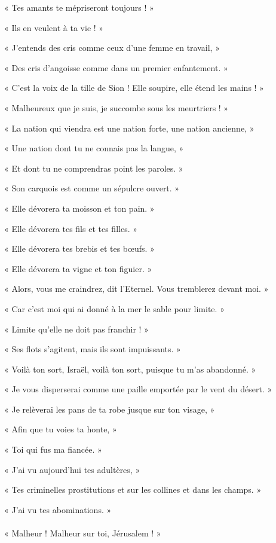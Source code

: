\documentclass[a4paper, 11pt, oneside, polutonikogreek, french]{article}
\begin{document}
« Tes amants te mépriseront toujours ! »

« Ils en veulent à ta vie ! »

« J'entends des cris comme ceux d'une femme en travail, »

« Des cris d'angoisse comme dans un premier enfantement. »

« C'est la voix de la tille de Sion ! Elle soupire, elle étend les mains ! »

« Malheureux que je suis, je succombe sous les meurtriers ! »

« La nation qui viendra est une nation forte, une nation ancienne, »

« Une nation dont tu ne connais pas la langue, »

« Et dont tu ne comprendras point les paroles. »

« Son carquois est comme un sépulcre ouvert. »

« Elle dévorera ta moisson et ton pain. »

« Elle dévorera tes fils et tes filles. »

« Elle dévorera tes brebis et tes bœufs. »

« Elle dévorera ta vigne et ton figuier. »

« Alors, vous me craindrez, dit l'Eternel. Vous tremblerez devant moi. »

« Car c'est moi qui ai donné à la mer le sable pour limite. »

« Limite qu'elle ne doit pas franchir ! »

« Ses flots s'agitent, mais ils sont impuissants. »

« Voilà ton sort, Israël, voilà ton sort, puisque tu m'as abandonné. »

« Je vous disperserai comme une paille emportée par le vent du désert. »

« Je relèverai les pans de ta robe jusque sur ton visage, »

« Afin que tu voies ta honte, »

« Toi qui fus ma fiancée. »

« J'ai vu aujourd'hui tes adultères, »

« Tes criminelles prostitutions et sur les collines et dans les champs. »

« J'ai vu tes abominations. »
\clearpage
\paragraph{}
« Malheur ! Malheur sur toi, Jérusalem ! »
\end{document}
